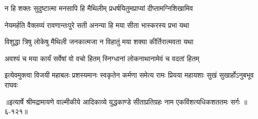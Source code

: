 \twolineshloka
{न हि शक्तः सुदुष्टात्मा मनसापि हि मैथिलीम्}
{प्रधर्षयितुमप्राप्यां दीप्तामग्निशिखामिव} %

\twolineshloka
{नेयमर्हति वैक्लव्यं रावणान्तःपुरे सती}
{अनन्या हि मया सीता भास्करस्य प्रभा यथा} %

\twolineshloka
{विशुद्धा त्रिषु लोकेषु मैथिली जनकात्मजा}
{न विहातुं मया शक्या कीर्तिरात्मवता यथा} %

\twolineshloka
{अवश्यं च मया कार्यं सर्वेषां वो वचो हितम्}
{स्निग्धानां लोकनाथानामेवं च वदतां हितम्} %

\twolineshloka
{इत्येवमुक्त्वा विजयी महाबलः प्रशस्यमानः स्वकृतेन कर्मणा}
{समेत्य रामः प्रियया महायशाः सुखं सुखार्होऽनुबभूव राघवः} %


॥इत्यार्षे श्रीमद्रामायणे वाल्मीकीये आदिकाव्ये युद्धकाण्डे सीताप्रतिग्रहः नाम एकविंशत्यधिकशततमः सर्गः ॥६-१२१॥
